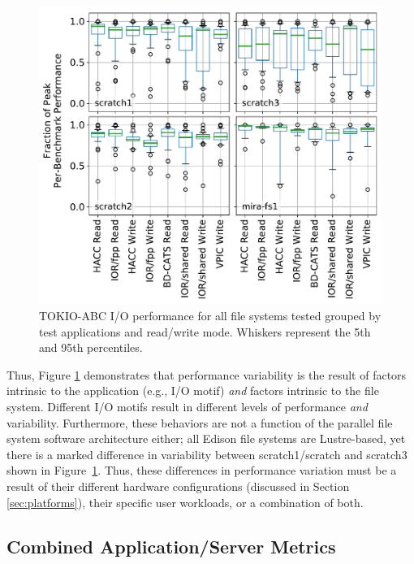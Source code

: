 \begin{figure}[t]
    \centering
    \includegraphics[width=1.0\columnwidth]{figs/perf-boxplots.pdf}
    \caption{TOKIO-ABC I/O performance for all file systems tested grouped by test
    applications and read/write mode.  Whiskers represent the 5th and 95th
    percentiles.}
    \label{fig:perf-summary-boxplots-motif}
\vspace{-.2in}
\end{figure}

Thus, Figure \ref{fig:perf-summary-boxplots-motif} demonstrates that 
performance variability is the result of factors intrinsic to the application
(e.g., I/O motif) \emph{and} factors intrinsic to the file system. 
Different I/O motifs result in different levels of performance \emph{and} variability.
Furthermore, these behaviors are not a function of the parallel file system software architecture either; all Edison file systems are Lustre-based, yet there is a marked difference in variability between scratch1/scratch and scratch3 shown in Figure~\ref{fig:perf-summary-boxplots-motif}.
Thus, these differences in performance variation must be a result of their different hardware configurations (discussed in Section \ref{sec:platforms}), their specific user workloads, or a combination of both.

\subsection{Combined Application/Server Metrics} \label{sec:results/combining}

